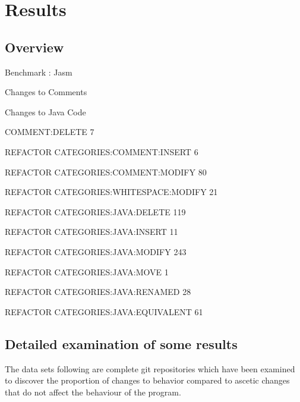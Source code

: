 \section{Results}
\subsection{Overview}
Benchmark : Jasm 

Changes to Comments

Changes to Java Code


COMMENT:DELETE 7

REFACTOR CATEGORIES:COMMENT:INSERT 6

REFACTOR CATEGORIES:COMMENT:MODIFY 80

REFACTOR CATEGORIES:WHITESPACE:MODIFY 21

REFACTOR CATEGORIES:JAVA:DELETE 119

REFACTOR CATEGORIES:JAVA:INSERT 11

REFACTOR CATEGORIES:JAVA:MODIFY 243

REFACTOR CATEGORIES:JAVA:MOVE 1

REFACTOR CATEGORIES:JAVA:RENAMED 28

REFACTOR CATEGORIES:JAVA:EQUIVALENT 61
\subsection{Detailed examination of some results}

The data sets following are complete git repositories which have been examined to discover the proportion of changes to behavior compared to ascetic changes that do not affect the behaviour of the program. 

% 
% 

